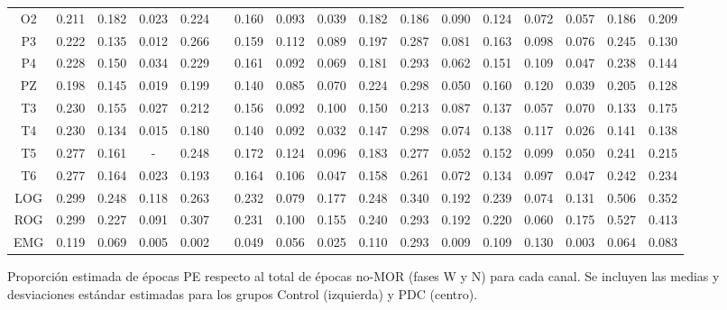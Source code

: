 \begin{SidewaysFigure}
\begin{tabular}{c||ccccc|cc||cccc|cc||ccc}
 O2 & 0.211    & 0.182    & 0.023    & 0.224    && 0.160    & 0.093    & 0.039    & 0.182    & 0.186    & 0.090    & 0.124    & 0.072    & 0.057    & 0.186    & 0.209     \\
 P3 & 0.222    & 0.135    & 0.012    & 0.266    && 0.159    & 0.112    & 0.089    & 0.197    & 0.287    & 0.081    & 0.163    & 0.098    & 0.076    & 0.245    & 0.130     \\
 P4 & 0.228    & 0.150    & 0.034    & 0.229    && 0.161    & 0.092    & 0.069    & 0.181    & 0.293    & 0.062    & 0.151    & 0.109    & 0.047    & 0.238    & 0.144     \\
 PZ & 0.198    & 0.145    & 0.019    & 0.199    && 0.140    & 0.085    & 0.070    & 0.224    & 0.298    & 0.050    & 0.160    & 0.120    & 0.039    & 0.205    & 0.128     \\
 T3 & 0.230    & 0.155    & 0.027    & 0.212    && 0.156    & 0.092    & 0.100    & 0.150    & 0.213    & 0.087    & 0.137    & 0.057    & 0.070    & 0.133    & 0.175     \\
 T4 & 0.230    & 0.134    & 0.015    & 0.180    && 0.140    & 0.092    & 0.032    & 0.147    & 0.298    & 0.074    & 0.138    & 0.117    & 0.026    & 0.141    & 0.138     \\
 T5 & 0.277    & 0.161    & -      & 0.248    && 0.172    & 0.124    & 0.096    & 0.183    & 0.277    & 0.052    & 0.152    & 0.099    & 0.050    & 0.241    & 0.215     \\
 T6 & 0.277    & 0.164    & 0.023    & 0.193    && 0.164    & 0.106    & 0.047    & 0.158    & 0.261    & 0.072    & 0.134    & 0.097    & 0.047    & 0.242    & 0.234     \\
 LOG & 0.299    & 0.248    & 0.118    & 0.263    && 0.232    & 0.079    & 0.177    & 0.248    & 0.340    & 0.192    & 0.239    & 0.074    & 0.131    & 0.506    & 0.352     \\
 ROG & 0.299    & 0.227    & 0.091    & 0.307    && 0.231    & 0.100    & 0.155    & 0.240    & 0.293    & 0.192    & 0.220    & 0.060    & 0.175    & 0.527    & 0.413     \\
 EMG & 0.119    & 0.069    & 0.005    & 0.002    && 0.049    & 0.056    & 0.025    & 0.110    & 0.293    & 0.009    & 0.109    & 0.130    & 0.003    & 0.064    & 0.083   
\end{tabular}
\caption{Proporci\'on estimada de \'epocas PE respecto al total de \'epocas no-MOR 
(fases W y N) para cada
canal. Se incluyen las medias y desviaciones est\'andar estimadas para los grupos 
Control (izquierda) y PDC (centro).}
\label{gpos_nmor}
\end{SidewaysFigure}

